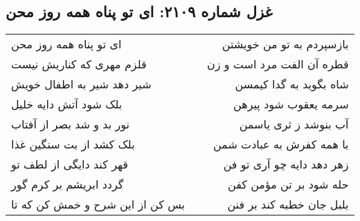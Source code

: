 \begin{center}
\section*{غزل شماره ۲۱۰۹: ای تو پناه همه روز محن}
\label{sec:2109}
\begin{longtable}{l p{0.5cm} r}
ای تو پناه همه روز محن
&&
بازسپردم به تو من خویشتن
\\
قلزم مهری که کناریش نیست
&&
قطره آن الفت مرد است و زن
\\
شیر دهد شیر به اطفال خویش
&&
شاه بگوید به گدا کیمسن
\\
بلک شود آتش دایه خلیل
&&
سرمه یعقوب شود پیرهن
\\
نور بد و شد بصر از آفتاب
&&
آب بنوشد ز ثری یاسمن
\\
بلک کشد از بت سنگین غذا
&&
با همه کفرش به عبادت شمن
\\
قهر کند دایگی از لطف تو
&&
زهر دهد دایه چو آری تو فن
\\
گردد ابریشم بر کرم گور
&&
حله شود بر تن مؤمن کفن
\\
بس کن از این شرح و خمش کن که تا
&&
بلبل جان خطبه کند بر فنن
\\
\end{longtable}
\end{center}

